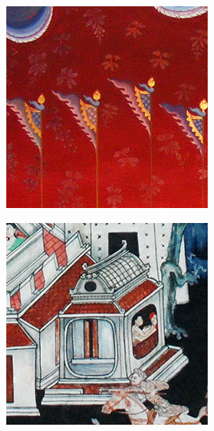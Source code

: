 \documentclass[xcolor=dvipsnames, xetex,serif]{beamer}
\begin{document}
\begin{frame}
\begin{figure}[H]
\begin{subfigure}{0.15\linewidth}
            \end{subfigure}
            \begin{subfigure}{0.15\linewidth}
                \centering
                \includegraphics[width=0.9\linewidth]{images/thaiart/case03-original.png}
            \end{subfigure}		
            \begin{subfigure}{0.15\linewidth}
                \centering
                \includegraphics[width=0.9\linewidth]{images/thaiart/case04-original.png}

\end{subfigure}
\end{figure}
\end{frame}
\end{document}
